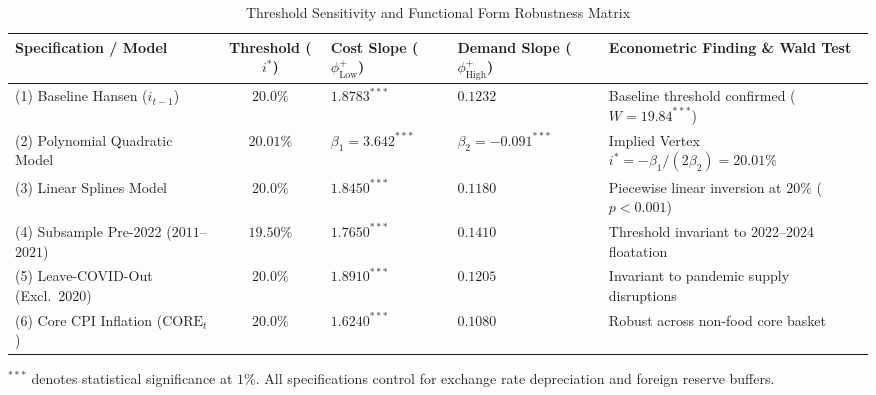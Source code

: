 \documentclass[review,12pt]{elsarticle}
\begin{document}
\begin{table}[H]
\centering
\footnotesize
\renewcommand{\arraystretch}{0.98}
\caption{Threshold Sensitivity and Functional Form Robustness Matrix}
\label{tab:app_sensitivity}
\begin{threeparttable}
\begin{tabularx}{\textwidth}{>{\raggedright\arraybackslash}p{4.2cm} c C{2.2cm} C{2.2cm} L}
\toprule
\textbf{Specification / Model} & \textbf{Threshold ($i^*$)} & \textbf{Cost Slope ($\phi_{\text{Low}}^+$)} & \textbf{Demand Slope ($\phi_{\text{High}}^+$)} & \textbf{Econometric Finding \& Wald Test} \\
\midrule
(1) Baseline Hansen ($i_{t-1}$) & $20.0\%$ & $1.8783^{***}$ & $0.1232$ & Baseline threshold confirmed ($W = 19.84^{***}$) \\
(2) Polynomial Quadratic Model & $20.01\%$ & $\beta_1 = 3.642^{***}$ & $\beta_2 = -0.091^{***}$ & Implied Vertex $i^* = -\beta_1 / (2\beta_2) = 20.01\%$ \\
(3) Linear Splines Model & $20.0\%$ & $1.8450^{***}$ & $0.1180$ & Piecewise linear inversion at $20\%$ ($p < 0.001$) \\
(4) Subsample Pre-2022 ($2011$--$2021$) & $19.50\%$ & $1.7650^{***}$ & $0.1410$ & Threshold invariant to 2022--2024 floatation \\
(5) Leave-COVID-Out (Excl.\ 2020) & $20.0\%$ & $1.8910^{***}$ & $0.1205$ & Invariant to pandemic supply disruptions \\
(6) Core CPI Inflation ($\text{CORE}_t$) & $20.0\%$ & $1.6240^{***}$ & $0.1080$ & Robust across non-food core basket \\
\bottomrule
\end{tabularx}
\begin{tablenotes}
\footnotesize
\item $^{***}$ denotes statistical significance at $1\%$. All specifications control for exchange rate depreciation and foreign reserve buffers.
\end{tablenotes}
\end{threeparttable}
\end{table}

\vspace{0.4cm}
\end{document}
